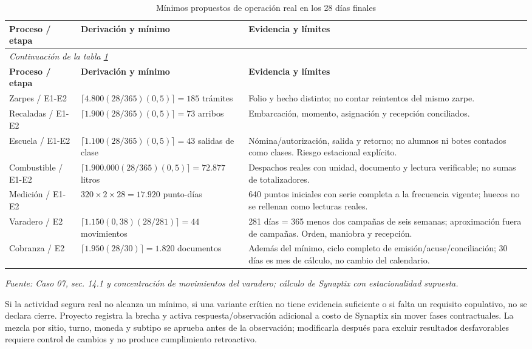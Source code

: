 \begingroup\small\setlength{\tabcolsep}{3pt}
\begin{longtable}{p{}p{}p{}}
\caption{Mínimos propuestos de operación real en los 28 días finales}\label{tab:t18-volumen}\\\hline
\textbf{Proceso / etapa} & \textbf{Derivación y mínimo} & \textbf{Evidencia y límites}\\\hline\endfirsthead
\multicolumn{3}{l}{\textit{Continuación de la tabla \ref{tab:t18-volumen}}}\\\hline
\textbf{Proceso / etapa} & \textbf{Derivación y mínimo} & \textbf{Evidencia y límites}\\\hline\endhead
\hline\endfoot\hline\endlastfoot
Zarpes / E1-E2 & $\lceil4.800(28/365)(0{,}5)\rceil=185$ trámites & Folio y hecho distinto; no contar reintentos del mismo zarpe.\\\hline
Recaladas / E1-E2 & $\lceil1.900(28/365)(0{,}5)\rceil=73$ arribos & Embarcación, momento, asignación y recepción conciliados.\\\hline
Escuela / E1-E2 & $\lceil1.100(28/365)(0{,}5)\rceil=43$ salidas de clase & Nómina/autorización, salida y retorno; no alumnos ni botes contados como clases. Riesgo estacional explícito.\\\hline
Combustible / E1-E2 & $\lceil1.900.000(28/365)(0{,}5)\rceil=72.877$ litros & Despachos reales con unidad, documento y lectura verificable; no sumas de totalizadores.\\\hline
Medición / E1-E2 & $320\times2\times28=17.920$ punto-días & 640 puntos iniciales con serie completa a la frecuencia vigente; huecos no se rellenan como lecturas reales.\\\hline
Varadero / E2 & $\lceil1.150(0{,}38)(28/281)\rceil=44$ movimientos & 281 días = 365 menos dos campañas de seis semanas; aproximación fuera de campañas. Orden, maniobra y recepción.\\\hline
Cobranza / E2 & $\lceil1.950(28/30)\rceil=1.820$ documentos & Además del mínimo, ciclo completo de emisión/acuse/conciliación; 30 días es mes de cálculo, no cambio del calendario.\\\hline
\end{longtable}\endgroup
\noindent\textit{Fuente: Caso 07, sec. 14.1 y concentración de movimientos del varadero; cálculo de Synaptix con estacionalidad supuesta.}


Si la actividad segura real no alcanza un mínimo, si una variante crítica no tiene evidencia suficiente o si falta un requisito copulativo, no se declara cierre. Proyecto registra la brecha y activa respuesta/observación adicional a costo de Synaptix sin mover fases contractuales. La mezcla por sitio, turno, moneda y subtipo se aprueba antes de la observación; modificarla después para excluir resultados desfavorables requiere control de cambios y no produce cumplimiento retroactivo.

